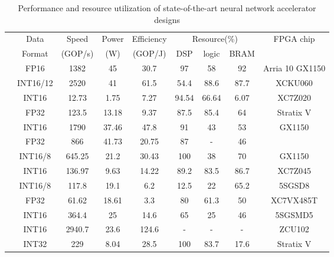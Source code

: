 \begin{table}[htbp]
    \centering
    \caption{Performance and resource utilization of state-of-the-art neural network accelerator designs}
    \begin{tabular}{|r|c|c|c|c|c|c|c|c|}
        \hline
        \multicolumn{1}{|c|}{} & Data  & Speed & Power & Efficiency & \multicolumn{3}{c|}{Resource(\%)} & \multirow{2}[4]{*}{FPGA chip} \bigstrut\\
    \cline{6-8}    \multicolumn{1}{|c|}{} & Format & (GOP/s) & (W)   & (GOP/J) & DSP   & logic & BRAM  &  \bigstrut\\
        \hline
            \cite{aydonat2017opencl} & FP16  & 1382  & 45    & 30.7  & 97    & 58    & 92    & Arria 10 GX1150 \bigstrut[t]\\ \hline
            \cite{han2017ese} & INT16/12 & 2520  & 41    & 61.5  & 54.4  & 88.6  & 87.7  & XCKU060 \\ \hline
            \cite{venieris2017fpgaconvnet} & INT16 & 12.73 & 1.75  & 7.27  & 94.54 & 66.64 & 6.07  & XC7Z020 \\ \hline
            \cite{zhang2017frequency} & FP32  & 123.5 & 13.18 & 9.37  & 87.5  & 85.4  & 64    & Stratix V \\ \hline
            \multicolumn{1}{|c|}{\multirow{2}[2]{*}{\cite{zhang2017improving}}} & INT16 & 1790  & 37.46 & 47.8  & 91    & 43    & 53    & \multirow{2}[2]{*}{GX1150}\\
            \cline{2-8}    \multicolumn{1}{|c|}{} & FP32  & 866   & 41.73 & 20.75 & 87    & -     & 46    &  \\ \hline
            \cite{ma2017optimizing} & INT16/8 & 645.25 & 21.2  & 30.43 & 100   & 38    & 70    & GX1150 \\ \hline
            \cite{qiu2016going} & INT16 & 136.97 & 9.63  & 14.22 & 89.2  & 83.5  & 86.7  & XC7Z045 \\ \hline
            \cite{suda2016throughput} & INT16/8 & 117.8 & 19.1  & 6.2   & 12.5  & 22    & 65.2  & 5SGSD8 \\ \hline
            \cite{zhang2015optimizing} & FP32  & 61.62 & 18.61 & 3.3   & 80    & 61.3  & 50    & XC7VX485T \\ \hline
            \cite{guan2017fp} & INT16 & 364.4 & 25    & 14.6  & 65    & 25    & 46    & 5SGSMD5 \\ \hline
            \cite{lu2017evaluating} & INT16 & 2940.7 & 23.6  & 124.6 &   -   &   -   &   -   & ZCU102 \\ \hline
            \cite{podili2017fast} & INT32 & 229   & 8.04  & 28.5  & 100   & 83.7  & 17.6  & Stratix V \\ \hline

\end{tabular}
\end{table}
